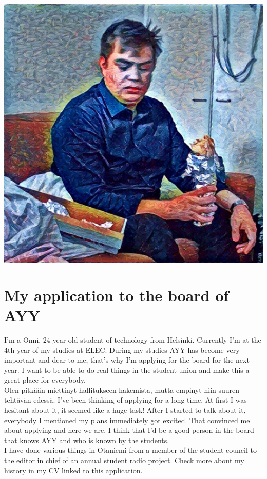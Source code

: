 \documentclass[a4paper, 12pt, english]{report}
\newcommand{\topic}{My application to the board of AYY}
\begin{document}
\includegraphics{Onni.jpg}
\section*{\topic}

I'm a Onni, 24 year old student of technology from Helsinki.
Currently I'm at the 4th year of my studies at ELEC.
During my studies AYY has become very important and dear to me,
that's why I'm applying for the board for the next year.
I want to be able to do real things in the student union and make this a great place for everybody.\\

Olen pitkään miettinyt hallitukseen hakemista, mutta empinyt niin suuren tehtävän edessä.
I've been thinking of applying for a long time.
At first I was hesitant about it, it seemed like a huge task!
After I started to talk about it, everybody I mentioned my plans immediately got excited.
That convinced me about applying and here we are.
I think that I'd be a good person in the board that knows AYY and who is known by the students.\\

I have done various things in Otaniemi from a member of the student council to the editor in chief of an annual student radio project.
Check more about my history in my CV linked to this application.\\
\end{document}

